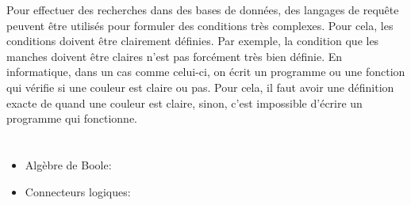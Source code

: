 {{Pour effectuer des recherches dans des bases de données, des langages de requête peuvent être utilisés pour formuler des conditions très complexes. Pour cela, les conditions doivent être clairement définies. Par exemple, la condition que les manches doivent être claires n’est pas forcément très bien définie. En informatique, dans un cas comme celui-ci, on écrit un programme ou une fonction qui vérifie si une couleur est claire ou pas. Pour cela, il faut avoir une définition exacte de quand une couleur est claire, sinon, c’est impossible d’écrire un programme qui fonctionne.



\section*{\BrochureWebsitesAndKeywords}
{\raggedright
\begin{itemize}
  \item Algèbre de Boole: \href{https://fr.wikipedia.org/wiki/Alg\%C3\%A8bre_de_Boole_(logique)}{}
  \item Connecteurs logiques: \href{https://fr.wikipedia.org/wiki/Connecteur_logique}{}
\end{itemize}


}

}{}

\def\AuthorCarrollC{} %
\def\AuthorLehtimakiT{} %
\def\AuthorNaughtonT{} %
\def\AuthorDatzkoS{} %
\def\AuthorFeklistovaL{} %
\def\AuthorBaumannW{} %
\def\AuthorArdickasD{} %
\def\AuthorPelletE{} %

\newpage}{}
